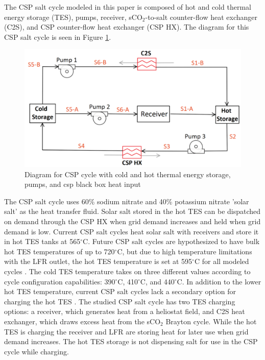 \begin{paracol}{2}
The CSP salt cycle modeled in this paper is composed of hot and cold thermal energy storage (TES), pumps, receiver, sCO$_2$-to-salt counter-flow heat exchanger (C2S), and CSP counter-flow heat exchanger (CSP HX). The diagram for this CSP salt cycle is seen in Figure \ref{csp}. 




\begin{figure}[H] 
    \widefigure
    \includegraphics[width=10 cm]{Definitions/csp.pdf}
    \caption{Diagram for CSP cycle with cold and hot thermal energy storage, pumps, and csp black box heat input\label{csp}}
\end{figure}

The CSP salt cycle uses 60\% sodium nitrate and 40\% potassium nitrate 'solar salt' as the heat transfer fluid. Solar salt stored in the hot TES can be dispatched on demand through the CSP HX when grid demand increases and held when grid demand is low. Current CSP salt cycles heat solar salt with receivers and store it in hot TES tanks at 565$^{\circ}$C. Future CSP salt cycles are hypothesized to have bulk hot TES temperatures of up to 720$^{\circ}$C, but due to high temperature limitations with the LFR outlet, the hot TES temperature is set at 595$^{\circ}$C for all modeled cycles \cite{mehos2017concentrating}. The cold TES temperature takes on three different values according to cycle configuration capabilities: 390$^{\circ}$C, 410$^{\circ}$C, and 440$^{\circ}$C. In addition to the lower hot TES temperature, current CSP salt cycles lack a secondary option for charging the hot TES \cite{hamilton2020dispatch}. The studied CSP salt cycle has two TES charging options: a receiver, which generates heat from a heliostat field, and C2S heat exchanger, which draws excess heat from the sCO$_2$ Brayton cycle. While the hot TES is charging the receiver and LFR are storing heat for later use when grid demand increases. The hot TES storage is not dispensing salt for use in the CSP cycle while charging.


\end{paracol}
